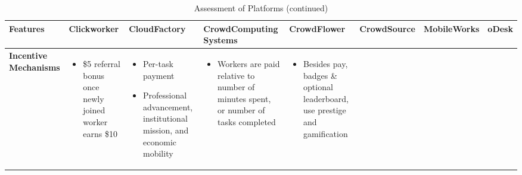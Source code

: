 \documentclass{sigchi}
\begin{document}
\begin{sidewaystable*}
\tiny
    \centering
    \caption{Assessment of Platforms (continued)}
\begin{tabular}[h]{| p{1.5cm}| p{2.7cm}| p{2.7cm}| p{2.7cm}| p{2.7cm}| p{2.7cm}| p{2.7cm}| p{2.7cm}|}
\hline
{\bf Features} & {\bf Clickworker} &{\bf CloudFactory} & {\bf CrowdComputing Systems} &{\bf CrowdFlower} &{\bf CrowdSource} &{\bf MobileWorks} &{\bf oDesk} \\ 
\hline


 

{\bf Incentive Mechanisms
} & 
{
\begin{itemize} [noitemsep,nolistsep]
\item  \$5 referral bonus once newly joined worker earns \$10
\end{itemize}
} &
{
\begin{itemize} [noitemsep,nolistsep]
\item  Per-task payment

\item  Professional advancement, institutional mission, and economic mobility
\end{itemize}
} &
{
\begin{itemize} [noitemsep,nolistsep]
\item  Workers are paid relative to number of minutes spent, or number of tasks completed
\end{itemize}
} &
{
\begin{itemize} [noitemsep,nolistsep]
\item  Besides pay, badges \& optional leaderboard, use prestige and gamification


\end{itemize}}
\end{tabular}
\end{sidewaystable*}
\end{document}
